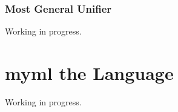 \documentclass{report}
\newcommand{\theLang}{myml}
\newcommand{\code}{\mathtt}
\newcommand{\backtick}{{}^{\backprime}}
\newcommand{\ruleTag}[1]{\label{#1}\tag{\textsc{#1}}}
\DeclareMathOperator{\mostGeneralUnifier}{mgu}
\newcommand{\newVariable}{newvar}
\newcommand{\entails}{\vdash}
\newcommand{\typingRelation}[4]{#1 \entails #2 \;:\; #3 ,\; #4}
\newcommand{\composite}{\circ}
\begin{document}

\subsection{Most General Unifier}

Working in progress.

\chapter{\theLang{} the Language}

Working in progress.
\end{document}
